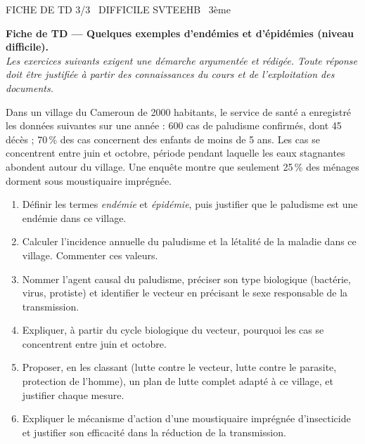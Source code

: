 \documentclass[11pt]{article}
\begin{document}
\begin{tcolorbox}[enhanced,colback=popink,colframe=popink,arc=10pt,boxrule=0pt,left=12pt,right=12pt,top=9pt,bottom=9pt]
{\color{white}\popxbold\small FICHE DE TD 3/3 \textbullet\ DIFFICILE \hfill SVTEEHB \textbullet\ 3ème\par}
\end{tcolorbox}
\vspace{4pt}
\textbf{Fiche de TD — Quelques exemples d'endémies et d'épidémies (niveau difficile).}\\
\emph{Les exercices suivants exigent une démarche argumentée et rédigée. Toute réponse doit être justifiée à partir des connaissances du cours et de l'exploitation des documents.}

\begin{exercice}
Dans un village du Cameroun de \num{2000} habitants, le service de santé a enregistré les données suivantes sur une année : \num{600} cas de paludisme confirmés, dont \num{45} décès ; \num{70}\,\% des cas concernent des enfants de moins de 5 ans. Les cas se concentrent entre juin et octobre, période pendant laquelle les eaux stagnantes abondent autour du village. Une enquête montre que seulement \num{25}\,\% des ménages dorment sous moustiquaire imprégnée.
\begin{enumerate}
\item Définir les termes \emph{endémie} et \emph{épidémie}, puis justifier que le paludisme est une endémie dans ce village.
\item Calculer l'incidence annuelle du paludisme et la létalité de la maladie dans ce village. Commenter ces valeurs.
\item Nommer l'agent causal du paludisme, préciser son type biologique (bactérie, virus, protiste) et identifier le vecteur en précisant le sexe responsable de la transmission.
\item Expliquer, à partir du cycle biologique du vecteur, pourquoi les cas se concentrent entre juin et octobre.
\item Proposer, en les classant (lutte contre le vecteur, lutte contre le parasite, protection de l'homme), un plan de lutte complet adapté à ce village, et justifier chaque mesure.
\item Expliquer le mécanisme d'action d'une moustiquaire imprégnée d'insecticide et justifier son efficacité dans la réduction de la transmission.
\end{enumerate}
\end{exercice}
\end{document}
